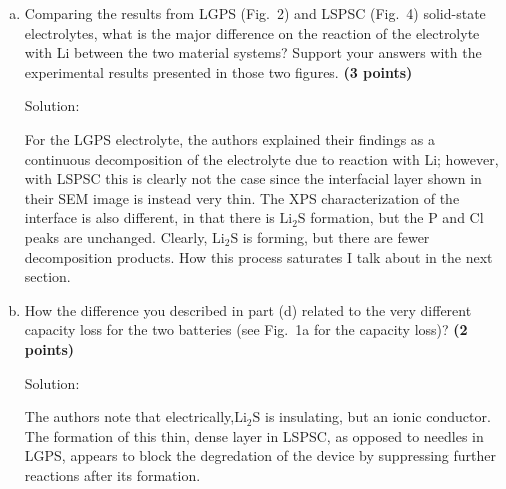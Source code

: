 \begin{homeworkProblem}
\begin{enumerate}[a)]
            \begin{callout}{Solution:}

                The IRL and IRR were proven to be sites at which there is the decomposition of pristine products to form LGPS \& $\mathrm{Li_2S}$. $\mathrm{Li_2S}$ has a lower average Z than LGPS, and because of the sensitivity towards Z afforded by CBS (higher Z results in reduced backscattering), we expect a contrast shift due to the appearance of these products in these regions.

            \end{callout}

        \item Comparing the results from LGPS (Fig.\ 2) and LSPSC (Fig.\ 4) solid-state electrolytes, what is the major difference on the reaction of the electrolyte with Li between the two material systems? Support your answers with the experimental results presented in those two figures. \textbf{(3 points)}

            \begin{callout}{Solution:}
            
                For the LGPS electrolyte, the authors explained their findings as a continuous decomposition of the electrolyte due to reaction with Li; however, with LSPSC this is clearly not the case since the interfacial layer shown in their SEM image is instead very thin. The XPS characterization of the interface is also different, in that there is $\mathrm{Li_2S}$ formation, but the P and Cl peaks are unchanged. Clearly, $\mathrm{Li_2S}$ is forming, but there are fewer decomposition products. How this process saturates I talk about in the next section.

            \end{callout}

        \item How the difference you described in part (d) related to the very different capacity loss for the two batteries (see Fig.\ 1a for the capacity loss)? \textbf{(2 points)}

            \begin{callout}{Solution:}

            The authors note that electrically,$\mathrm{Li_2S}$ is insulating, but an ionic conductor. The formation of this thin, dense layer in LSPSC, as opposed to needles in LGPS, appears to block the degredation of the device by suppressing further reactions after its formation.

            \end{callout}

    \end{enumerate}

\end{homeworkProblem}

\newpage
